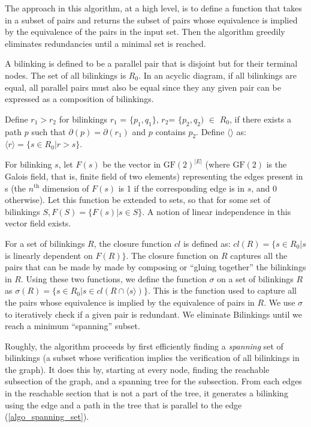 \documentclass[sigplan,review,nonacm=true]{acmart}
\begin{document}
The approach in this algorithm, at a high level, is to define a function that takes in a subset of pairs and returns the subset of pairs whose equivalence is implied by the equivalence of the pairs in the input set.
Then the algorithm greedily eliminates redundancies until a minimal set is reached.

A bilinking is defined to be a parallel pair that is disjoint but for their terminal nodes. The set of all bilinkings is $R_0$.
In an acyclic diagram, if all bilinkings are equal, all parallel pairs must also be equal since they any given pair can be expressed as a composition of bilinkings.

Define $r_1>r_2$ for bilinkings $r_1$ = $\{p_1,q_1\}$, $r_2$= $\{p_2, q_2)$ $\in$ $R_0$, if there exists a path $p$ such that $\partial(p) = \partial(r_1)$ and $p$ contains $p_2$.
Define $\langle\rangle$ as:
$\langle r \rangle = \{ s\in R_0| r>s\}$.

For bilinking $s$, let $F(s)$ be the vector in $\text{GF}(2)^{|E|}$ (where $\text{GF}(2)$ is the Galois field, that is, finite field of two elements) representing the edges present in s (the $n^{\text{th}}$ dimension of $F(s)$ is 1 if the corresponding edge is in $s$, and 0 otherwise).
Let this function be extended to sets, so that for some set of bilinkings $S, F(S) = \{ F(s) | s\in S \}$. A notion of linear independence in this vector field exists.

For a set of bilinkings $R$, the closure function $cl$ is defined as:
$cl(R) = \{ s\in R_0| s$ is linearly dependent on $F(R) \}$.
%
The closure function on $R$ captures all the pairs that can be made by made by composing or ``gluing together'' the bilinkings in $R$. 
%
Using these two functions, we define the function $\sigma$ on a set of bilinkings $R$ as
$\sigma(R) = \{s \in R_0 | s\in cl(R\cap \langle s \rangle) \}$.
This is the function used to capture all the pairs whose equivalence is implied by the equivalence of pairs in $R$.
%
We use $\sigma$ to iteratively check if a given pair is redundant.
We eliminate Bilinkings until we reach a minimum ``spanning'' subset.

Roughly, the algorithm proceeds by first efficiently finding a \textit{spanning} set of bilinkings (a subset whose verification implies the verification of all bilinkings in the graph).
It does this by, starting at every node, finding the reachable subsection of the graph, and a spanning tree for the subsection.
From each edges in the reachable section that is not a part of the tree, it generates a bilinking using the edge and a path in the tree that is parallel to the edge (\ref{algo_spanning_set}).
\end{document}
